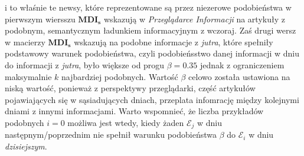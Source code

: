 i to właśnie te newsy, które reprezentowane są przez  niezerowe podobieństwa w pierwszym wiersszu 
$\mathbf{MDI_s}$ wskazują w \textit{Przeglądarce Informacji} na artykuły z podobnym, semantycznym ładunkiem
informacyjnym z wczoraj. Zaś drugi wersz w macierzy $\mathbf{MDI_s}$ wskazują na podobne informacje 
z \textit{jutra}, które spełniły podstawowy warunek podobieństwa, czyli podobieńsstwo danej informacji 
w dniu do informacji z \textit{jutra}, było większe od progu $\beta = 0.35$ jednak z ograniczeniem 
maksymalnie $k$ najbardziej podobnych. Wartość $\beta$ celowo została ustawiona na niską wartość, 
ponieważ z perspektywy przeglądarki, część artykułów pojawiających się w sąsiadujących dniach, 
przeplata infomrację między kolejnymi dniami z innymi informacjami. Warto wspomnieć, że liczba przykładów
podobnych $i=0$ możliwa jest wtedy, kiedy żaden $\mathcal{E}_{j}$ w dniu następnym/poprzednim nie spełnił
warunku podobieństwa $\beta$ do $\mathcal{E}_{i}$ w dniu \textit{dzisiejszym}.

